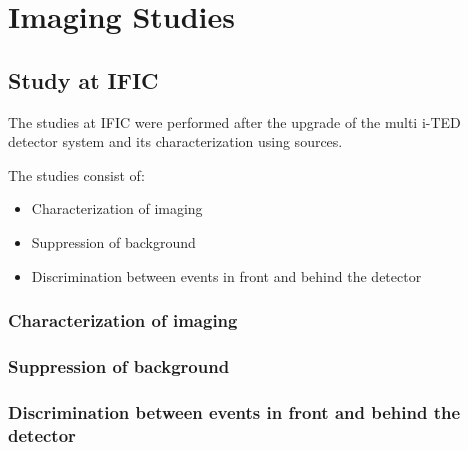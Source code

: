 \chapter{Imaging Studies}\label{ch:performance}

\section{Study at IFIC}

The studies at \ac{IFIC} were performed after the upgrade of the multi \ac{i-TED} detector system and its characterization using sources.

The studies consist of:
\begin{itemize}
    \item Characterization of imaging
    \item Suppression of background
    \item Discrimination between events in front and behind the detector
\end{itemize}

\subsection{Characterization of imaging}

\subsection{Suppression of background}

\subsection{Discrimination between events in front and behind the detector}

